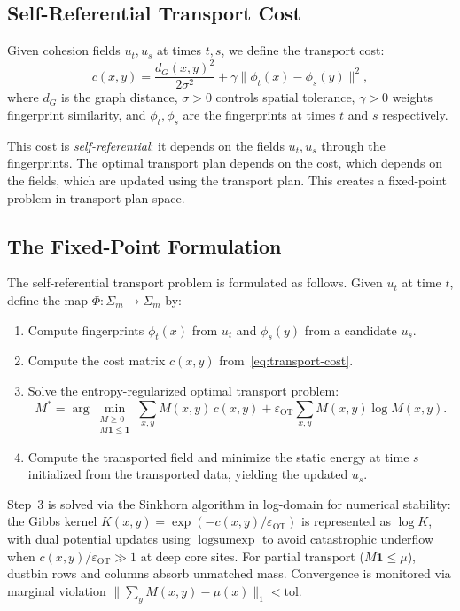 \documentclass[lettersize,journal]{IEEEtran}
\begin{document}
\subsection{Self-Referential Transport Cost}

Given cohesion fields $u_t, u_s$ at times $t, s$, we define the transport cost:
\begin{equation}
\label{eq:transport-cost}
c(x,y) = \frac{d_G(x,y)^2}{2\sigma^2} + \gamma\|\phi_t(x) - \phi_s(y)\|^2,
\end{equation}
where $d_G$ is the graph distance, $\sigma > 0$ controls spatial tolerance, $\gamma > 0$ weights fingerprint similarity, and $\phi_t, \phi_s$ are the fingerprints at times $t$ and $s$ respectively.

This cost is \emph{self-referential}: it depends on the fields $u_t, u_s$ through the fingerprints. The optimal transport plan depends on the cost, which depends on the fields, which are updated using the transport plan. This creates a fixed-point problem in transport-plan space.

\subsection{The Fixed-Point Formulation}

The self-referential transport problem is formulated as follows. Given $u_t$ at time $t$, define the map $\Phi : \Sigma_m \to \Sigma_m$ by:
\begin{enumerate}
\item Compute fingerprints $\phi_t(x)$ from $u_t$ and $\phi_s(y)$ from a candidate $u_s$.
\item Compute the cost matrix $c(x,y)$ from~\eqref{eq:transport-cost}.
\item Solve the entropy-regularized optimal transport problem:
\begin{equation}
M^* = \arg\min_{\substack{M \geq 0 \\ M\mathbf{1} \leq \mathbf{1}}} \sum_{x,y} M(x,y)\,c(x,y) + \varepsilon_{\mathrm{OT}}\sum_{x,y} M(x,y)\log M(x,y).
\end{equation}
\item Compute the transported field and minimize the static energy at time $s$ initialized from the transported data, yielding the updated $u_s$.
\end{enumerate}

\noindent Step~3 is solved via the Sinkhorn algorithm in log-domain for numerical stability: the Gibbs kernel $K(x,y) = \exp(-c(x,y)/\varepsilon_{\mathrm{OT}})$ is represented as $\log K$, with dual potential updates using $\operatorname{logsumexp}$ to avoid catastrophic underflow when $c(x,y)/\varepsilon_{\mathrm{OT}} \gg 1$ at deep core sites. For partial transport ($M\mathbf{1} \leq \mu$), dustbin rows and columns absorb unmatched mass. Convergence is monitored via marginal violation $\|\sum_y M(x,y) - \mu(x)\|_1 < \mathrm{tol}$.
\end{document}
